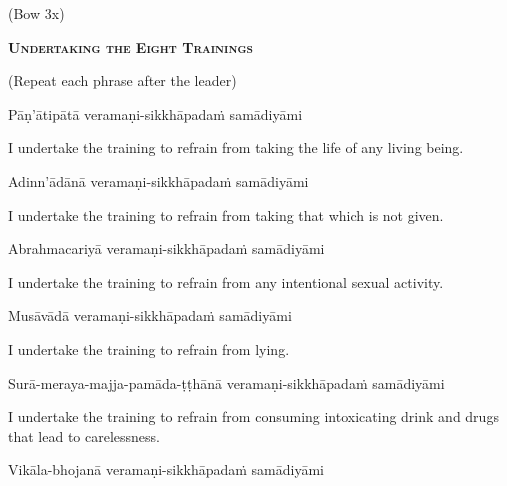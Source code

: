 \begin{center}
  (Bow 3x)
\end{center}

\clearpage



\begin{center}
  \textbf{\textsc{Undertaking the Eight Trainings}}
\end{center}
\begin{center}
  (Repeat each phrase after the leader)
\end{center}

Pāṇ'ātipātā veramaṇi-sikkhāpadaṁ samādiyāmi

\begin{english-hang}
  I undertake the training to refrain from taking the life of any living being.
\end{english-hang}

Adinn'ādānā veramaṇi-sikkhāpadaṁ samādiyāmi

\begin{english-hang}
  I undertake the training to refrain from taking that which is not given.
\end{english-hang}

Abrahmacariyā veramaṇi-sikkhāpadaṁ samādiyāmi

\begin{english-hang}
  I undertake the training to refrain from any intentional sexual activity.
\end{english-hang}

Musāvādā veramaṇi-sikkhāpadaṁ samādiyāmi

\begin{english}
  I undertake the training to refrain from lying.
\end{english}

\begin{pali-hang}
  Surā-meraya-majja-pamāda-ṭṭhānā veramaṇi-sikkhāpadaṁ samādiyāmi
\end{pali-hang}

\begin{english-hang}
  I undertake the training to refrain from consuming intoxicating drink and drugs that\ifdigitalversion\makeatletter\hyperlink{endnote141-appendix}\makeatother\fi
  lead to carelessness.
\end{english-hang}

Vikāla-bhojanā veramaṇi-sikkhāpadaṁ samādiyāmi

